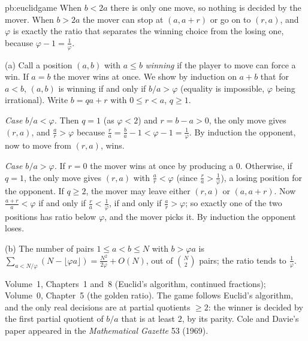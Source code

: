 \begin{solution}{pb:euclidgame}
\idea When $b<2a$ there is only one move, so nothing is decided by the mover. When $b>2a$ the mover can stop at
$(a,a+r)$ or go on to $(r,a)$, and $\varphi$ is exactly the ratio that separates the winning choice from the losing one,
because $\varphi-1=\frac1\varphi$.

\writeup (a) Call a position $(a,b)$ with $a\le b$ \emph{winning} if the player to move can force a win. If $a=b$ the mover wins at once.
We show by induction on $a+b$ that for $a<b$, $(a,b)$ is winning if and only if $b/a>\varphi$ (equality is impossible, $\varphi$ being
irrational). Write $b=qa+r$ with $0\le r<a$, $q\ge1$.

\emph{Case $b/a<\varphi$.} Then $q=1$ (as $\varphi<2$) and $r=b-a>0$, the only move gives $(r,a)$, and $\frac ar>\varphi$ because
$\frac ra=\frac ba-1<\varphi-1=\frac1\varphi$. By induction the opponent, now to move from $(r,a)$, wins.

\emph{Case $b/a>\varphi$.} If $r=0$ the mover wins at once by producing a $0$. Otherwise, if $q=1$, the only move
gives $(r,a)$ with $\frac ar<\varphi$ (since $\frac ra>\frac1\varphi$), a losing position for the opponent. If $q\ge2$, the mover may
leave either $(r,a)$ or $(a,a+r)$. Now $\frac{a+r}a<\varphi$ if and only if $\frac ra<\frac1\varphi$, if and only if $\frac ar>\varphi$; so
exactly one of the two positions has ratio below $\varphi$, and the mover picks it. By induction the opponent loses.

(b) The number of pairs $1\le a<b\le N$ with $b>\varphi a$ is $\sum_{a<N/\varphi}(N-\lfloor\varphi a\rfloor)=\frac{N^2}{2\varphi}+O(N)$,
out of $\binom N2$ pairs; the ratio tends to $\frac1\varphi$.

\tools Volume~1, Chapters~1 and~8 (Euclid's algorithm, continued fractions); Volume~0, Chapter~5 (the golden ratio).
\leads The game follows Euclid's algorithm, and the only real decisions are at partial quotients $\ge2$: the winner is decided by
the first partial quotient of $b/a$ that is at least $2$, by its parity. Cole and Davie's paper appeared in the \emph{Mathematical
Gazette} 53 (1969).
\end{solution}

